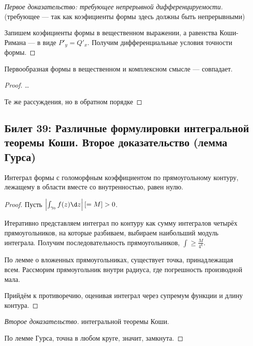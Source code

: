 \documentclass[12pt, a4paper, oneside]{memoir}
\begin{document}
\begin{proof}
    [Первое доказательство: требующее непрерывной дифференцируемости]

    (требующее — так как коэфициенты формы здесь должны быть непрерывными)

    Запишем коэфициенты формы в вещественном выражении, а равенства Коши-Римана — в виде $P'_y = Q'_x$.
    Получим дифференциальные условия точности формы.
\end{proof}

\begin{remark}
    Первообразная формы в вещественном и комплексном смысле — совпадает.

    \begin{proof}
        \leftimp …

        \rightimp Те же рассуждения, но в обратном порядке
    \end{proof}
\end{remark}

\subsection{Билет 39: Различные формулировки интегральной теоремы Коши. Второе доказательство (лемма Гурса)}


\begin{lemma}
    [Э. Гурс]

    Интеграл формы с голоморфным коэффициентом по прямоугольному контуру,
    лежащему в области вместе со внутренностью, равен нулю.

    \begin{proof}
        Пусть $\left| \int_{\gamma_0} f(z) \d z \right| [= M] > 0$.

        Итеративно представляем интеграл по контуру как сумму интегралов четырёх прямоугольников, 
        на которые разбиваем, выбираем наибольший модуль интеграла. Получим последовательность прямоугольников, $\int \geqslant \frac{M}{4^k}$.

        По лемме о вложенных прямоугольниках, существует точка, принадлежащая всем. 
        Рассморим прямоугольник внутри радиуса, где погрешность производной мала.

        Прийдём к противоречию, оценивая интеграл через супремум функции и длину контура.
    \end{proof}
\end{lemma}

\begin{proof}
    [Второе доказательство] интегральной теоремы Коши.
    
    По лемме Гурса, точна в любом круге, значит, замкнута.
\end{proof}
\end{document}
